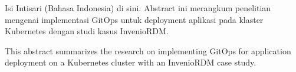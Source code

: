 \documentclass[proposal,indonesia]{ugmskripsi}
\begin{document}
\cover
\titlepageind
\approvalpage

\tableofcontents

\abstractind
Isi Intisari (Bahasa Indonesia) di sini. Abstract ini merangkum penelitian mengenai implementasi GitOps untuk deployment aplikasi pada klaster Kubernetes dengan studi kasus InvenioRDM.
\endabstractind

\abstracteng
This abstract summarizes the research on implementing GitOps for application deployment on a Kubernetes cluster with an InvenioRDM case study.
\endabstracteng







\end{document}
